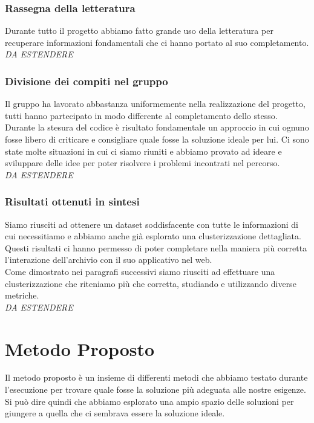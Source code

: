 \documentclass[12pt,a4paper,twoside]{article}
\begin{document}
\subsubsection{Rassegna della letteratura}
Durante tutto il progetto abbiamo fatto grande uso della letteratura per recuperare informazioni 
fondamentali che ci hanno portato al suo completamento.\\
\textit{DA ESTENDERE}

\subsubsection{Divisione dei compiti nel gruppo}
Il gruppo ha lavorato abbastanza uniformemente nella realizzazione del progetto, tutti hanno 
partecipato in modo differente al completamento dello stesso.\\
Durante la stesura del codice è risultato fondamentale un approccio in cui ognuno fosse libero di 
criticare e consigliare quale fosse la soluzione ideale per lui. Ci sono state molte 
situazioni in cui ci siamo riuniti e abbiamo provato ad ideare e sviluppare delle idee per poter 
risolvere i problemi incontrati nel percorso.\\
\textit{DA ESTENDERE}

\subsubsection{Risultati ottenuti in sintesi}
Siamo riusciti ad ottenere un dataset soddisfacente con tutte le informazioni di cui necessitiamo 
e abbiamo anche già esplorato una clusterizzazione dettagliata.\\
Questi risultati ci hanno permesso di poter completare nella maniera più corretta l'interazione 
dell'archivio con il suo applicativo nel web.\\
Come dimostrato nei paragrafi successivi siamo riusciti ad effettuare una clusterizzazione che 
riteniamo più che corretta, studiando e utilizzando diverse metriche.\\
\textit{DA ESTENDERE}


\newpage
\section{Metodo Proposto}
Il metodo proposto è un insieme di differenti metodi che abbiamo testato durante l'esecuzione
per trovare quale fosse la soluzione più adeguata alle nostre esigenze.\\
Si può dire quindi che abbiamo esplorato una ampio spazio delle soluzioni per giungere a quella 
che ci sembrava essere la soluzione ideale.
\end{document}
